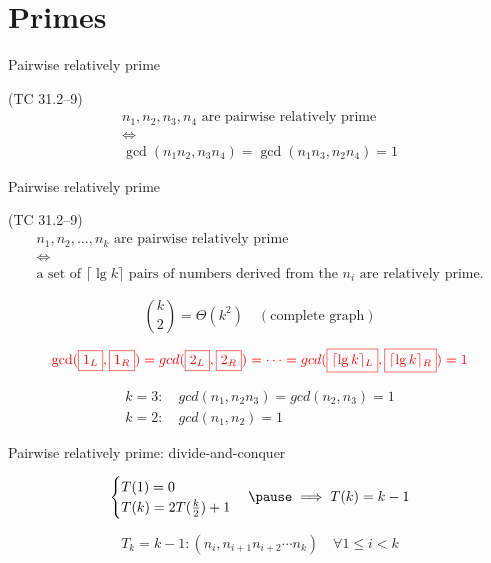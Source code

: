\section{Primes}

\begin{frame}{Pairwise relatively prime}
  \begin{exampleblock}{(TC 31.2--9)}
	\begin{gather*}
	  n_1, n_2, n_3, n_4 \text{ are pairwise relatively prime} \\
	  \iff \\
	  \gcd(n_1n_2, n_3n_4) = \gcd(n_1n_3, n_2n_4) = 1
	\end{gather*}
  \end{exampleblock}
\end{frame}
\begin{frame}{Pairwise relatively prime}
  \begin{exampleblock}{(TC 31.2--9)}
	\begin{gather*}
	  n_1, n_2, \dots, n_k \text{ are pairwise relatively prime} \\
	  \iff \\
	  \text{a set of } \lceil \lg k \rceil \text{ pairs of numbers derived from the } n_i \text{ are relatively prime}.
	\end{gather*}
  \end{exampleblock}

  \pause
  \[
	\binom{k}{2} = \Theta(k^2)	\quad (\text{complete graph})
  \]

  \pause
  \[
	\textcolor{red}{\gcd(\fbox{$1_L$}, \fbox{$1_R$}) 
	= gcd(\fbox{$2_L$}, \fbox{$2_R$}) 
	= \cdots 
	= gcd(\fbox{$\lceil \lg k \rceil_L$}, \fbox{$\lceil \lg k \rceil_R$}) = 1}
  \]

  \pause
  \begin{gather*}
	k = 3: \quad gcd(n_1, n_2n_3) = gcd(n_2, n_3) = 1 \\
	k = 2: \quad gcd(n_1, n_2) = 1
  \end{gather*}
\end{frame}
\begin{frame}{Pairwise relatively prime: divide-and-conquer}


  \pause
  \begin{equation*}
	\begin{cases}
	  T(1) = 0 \\
	  T(k) = 2T(\frac{k}{2}) + 1
	\end{cases} \pause \implies T(k) = k - 1
  \end{equation*}

  \pause
  \[
	T_k = k-1: (n_i, n_{i+1}n_{i+2}\cdots n_{k}) \quad \forall 1 \le i < k
  \]
\end{frame}
